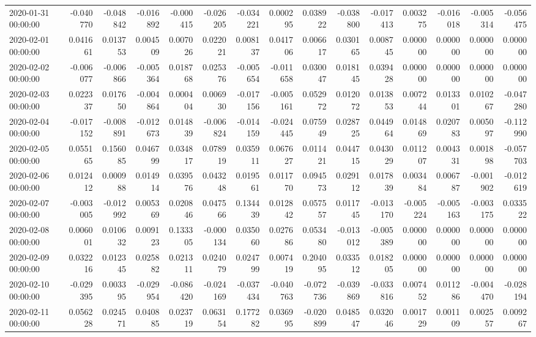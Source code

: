 \begin{tabular}{lrrrrrrrrrrrrrr}
2020-01-31 00:00:00 & -0.040770 & -0.048842 & -0.016892 & -0.000415 & -0.026205 & -0.034221 & 0.000295 & 0.038922 & -0.038800 & -0.017413 & 0.003275 & -0.016018 & -0.005314 & -0.056475 \\
2020-02-01 00:00:00 & 0.041661 & 0.013753 & 0.004509 & 0.007026 & 0.022021 & 0.008137 & 0.041706 & 0.006617 & 0.030165 & 0.008745 & 0.000000 & 0.000000 & 0.000000 & 0.000000 \\
2020-02-02 00:00:00 & -0.006077 & -0.006866 & -0.005364 & 0.018768 & 0.025376 & -0.005654 & -0.011658 & 0.030047 & 0.018145 & 0.039428 & 0.000000 & 0.000000 & 0.000000 & 0.000000 \\
2020-02-03 00:00:00 & 0.022337 & 0.017650 & -0.004864 & 0.000404 & 0.006930 & -0.017156 & -0.005161 & 0.052972 & 0.012072 & 0.013853 & 0.007244 & 0.013301 & 0.010267 & -0.047280 \\
2020-02-04 00:00:00 & -0.017152 & -0.008891 & -0.012673 & 0.014839 & -0.006824 & -0.014159 & -0.024445 & 0.075949 & 0.028725 & 0.044964 & 0.014869 & 0.020783 & 0.005097 & -0.112990 \\
2020-02-05 00:00:00 & 0.055165 & 0.156085 & 0.046799 & 0.034817 & 0.078919 & 0.035911 & 0.067627 & 0.011421 & 0.044715 & 0.043029 & 0.011207 & 0.004331 & 0.001898 & -0.057703 \\
2020-02-06 00:00:00 & 0.012412 & 0.000988 & 0.014914 & 0.039576 & 0.043248 & 0.019561 & 0.011770 & 0.094573 & 0.029112 & 0.017839 & 0.003484 & 0.006787 & -0.001902 & -0.012619 \\
2020-02-07 00:00:00 & -0.003005 & -0.012992 & 0.005369 & 0.020846 & 0.047566 & 0.134439 & 0.012842 & 0.057557 & 0.011745 & -0.013170 & -0.005224 & -0.005163 & -0.003175 & 0.033522 \\
2020-02-08 00:00:00 & 0.006001 & 0.010632 & 0.009123 & 0.133305 & -0.000134 & 0.035060 & 0.027686 & 0.053480 & -0.013012 & -0.005389 & 0.000000 & 0.000000 & 0.000000 & 0.000000 \\
2020-02-09 00:00:00 & 0.032216 & 0.012345 & 0.025882 & 0.021311 & 0.024079 & 0.024799 & 0.007419 & 0.204095 & 0.033512 & 0.018205 & 0.000000 & 0.000000 & 0.000000 & 0.000000 \\
2020-02-10 00:00:00 & -0.029395 & 0.003395 & -0.029954 & -0.086420 & -0.024169 & -0.037434 & -0.040763 & -0.072736 & -0.039869 & -0.033816 & 0.007452 & 0.011286 & -0.004470 & -0.028194 \\
2020-02-11 00:00:00 & 0.056228 & 0.024571 & 0.040885 & 0.023719 & 0.063154 & 0.177282 & 0.036995 & -0.020899 & 0.048547 & 0.032046 & 0.001729 & 0.001109 & 0.002557 & 0.009267 \\

\end{tabular}
